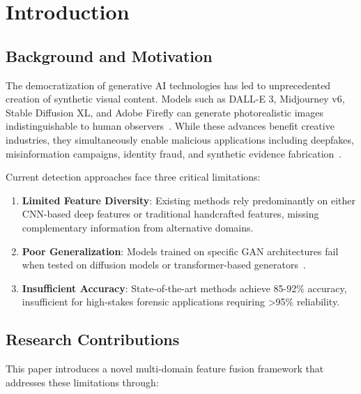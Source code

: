 \documentclass[runningheads]{llncs}
\begin{document}
\section{Introduction}

\subsection{Background and Motivation}

The democratization of generative AI technologies has led to unprecedented creation of synthetic visual content. Models such as DALL-E 3, Midjourney v6, Stable Diffusion XL, and Adobe Firefly can generate photorealistic images indistinguishable to human observers~\cite{ramesh2022hierarchical,rombach2022high}. While these advances benefit creative industries, they simultaneously enable malicious applications including deepfakes, misinformation campaigns, identity fraud, and synthetic evidence fabrication~\cite{tolosana2020deepfakes}.

Current detection approaches face three critical limitations:
\begin{enumerate}
    \item \textbf{Limited Feature Diversity}: Existing methods rely predominantly on either CNN-based deep features or traditional handcrafted features, missing complementary information from alternative domains.
    \item \textbf{Poor Generalization}: Models trained on specific GAN architectures fail when tested on diffusion models or transformer-based generators~\cite{wang2020cnn}.
    \item \textbf{Insufficient Accuracy}: State-of-the-art methods achieve 85-92\% accuracy, insufficient for high-stakes forensic applications requiring >95\% reliability.
\end{enumerate}

\subsection{Research Contributions}

This paper introduces a novel multi-domain feature fusion framework that addresses these limitations through:
\end{document}
